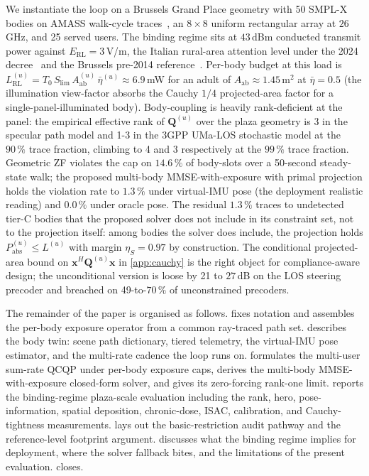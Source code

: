 \documentclass[journal,twocolumn,10pt]{IEEEtran}
\theoremstyle{plain}
\theoremstyle{remark}
\newcommand{\xx}{\mathbf{x}}
\newcommand{\Pabs}{P_{\mathrm{abs}}}
\newcommand{\Aab}{A_{\mathrm{ab}}}
\newcommand{\Qmat}{\mathbf{Q}}
\begin{document}
We instantiate the loop on a Brussels Grand Place geometry with
50 SMPL-X bodies on AMASS walk-cycle traces~\cite{SMPL,SMPLX,AMASS},
an $8\times 8$ uniform rectangular array at $26\,$GHz, and 25 served
users. The binding regime sits at $43\,$dBm conducted transmit power
against $E_{\mathrm{RL}} = 3\,$V/m, the Italian rural-area
attention level under the 2024 decree~\cite{ItalyDL} and the
Brussels pre-2014 reference~\cite{BrusselsArrete2007}. Per-body
budget at this load is $L^{(u)}_{\mathrm{RL}} =
T_0\,S_{\mathrm{lim}}\,\Aab^{(u)}\,\bar\eta^{(u)} \approx
6.9\,$mW for an adult of $\Aab \approx 1.45\,$m$^2$ at $\bar\eta =
0.5$ (the illumination view-factor absorbs the Cauchy $1/4$
projected-area factor for a single-panel-illuminated body).
Body-coupling is heavily rank-deficient at the panel: the empirical
effective rank of $\Qmat^{(u)}$ over the plaza geometry is 3 in the
specular path model and 1-3 in the 3GPP UMa-LOS stochastic model at
the $90\,\%$ trace fraction, climbing to 4 and 3 respectively at the
$99\,\%$ trace fraction. Geometric ZF violates the cap on $14.6\,\%$
of body-slots over a 50-second steady-state walk; the proposed
multi-body MMSE-with-exposure with primal projection holds the
violation rate to $1.3\,\%$ under virtual-IMU pose (the deployment
realistic reading) and $0.0\,\%$ under oracle pose. The residual
$1.3\,\%$ traces to undetected tier-C bodies that the proposed
solver does not include in its constraint set, not to the projection
itself: among bodies the solver does include, the projection holds
$\Pabs^{(u)} \leq L^{(u)}$ with margin $\eta_S = 0.97$ by
construction. The conditional projected-area bound on
$\xx^H \Qmat^{(u)} \xx$ in \cref{app:cauchy} is the right object for
compliance-aware design; the unconditional version is loose by 21 to
$27\,$dB on the LOS steering precoder and breached on 49-to-$70\,\%$
of unconstrained precoders.

The remainder of the paper is organised as follows.
 fixes notation and assembles the per-body exposure
operator from a common ray-traced path set.  describes
the body twin: scene path dictionary, tiered telemetry,
the virtual-IMU pose estimator, and the multi-rate cadence the loop
runs on.  formulates the multi-user sum-rate
QCQP under per-body exposure caps, derives the multi-body MMSE-with-exposure closed-form
solver, and gives its zero-forcing rank-one limit.
 reports the binding-regime plaza-scale evaluation
including the rank, hero, pose-information, spatial deposition,
chronic-dose, ISAC, calibration, and Cauchy-tightness measurements.
 lays out the basic-restriction audit pathway
and the reference-level footprint argument. 
discusses what the binding regime implies for deployment, where the
solver fallback bites, and the limitations of the present
evaluation.  closes.
\end{document}
